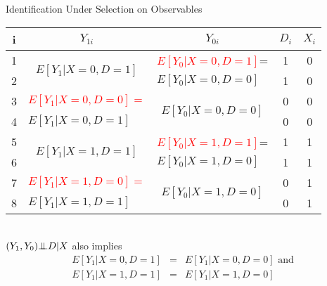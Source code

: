 \documentclass{beamer}
\numberwithin{equation}{section}
\newcommand{\indep}{{\bot\negthickspace\negthickspace\bot}}
\begin{document}
\begin{frame}{Identification Under Selection on Observables}
\begin{overprint}
\begin{small}
\begin{tabular}{c|c|c|c|c}
\hline
   i  & $Y_{1i}$  & $Y_{0i}$ &    $D_i$ &  $X_i$ \\
\hline
         1 & \multirow{2}{*}{$E[Y_1|X=0,D=1]$ } & \multicolumn{ 1}{c|}{\textcolor{red}{$E[Y_0|X=0,D=1]$}= } &                    1 &          0 \\
         2 & \multicolumn{ 1}{c|}{} & \multicolumn{ 1}{l|}{$E[Y_0|X=0,D=0]$} &                    1 &          0 \\
\hline
         3 & \multicolumn{ 1}{c|}{\textcolor{red}{$E[Y_1|X=0,D=0]=$}} & \multirow{2}{*}{$E[Y_0|X=0,D=0]$ } &                   0 &          0 \\
         4 & \multicolumn{ 1}{l|}{$E[Y_1|X=0,D=1]$} & \multicolumn{ 1}{c|}{} &                    0 &          0 \\
\hline
         5 & \multirow{2}{*}{$E[Y_1|X=1,D=1]$ } & \multicolumn{ 1}{c|}{\textcolor{red}{$E[Y_0|X=1,D=1]$}=} &                    1 &          1 \\
         6 & \multicolumn{ 1}{c|}{} & \multicolumn{ 1}{l|}{$E[Y_0|X=1,D=0]$} &                    1 &          1 \\
\hline
         7 &\multicolumn{ 1}{c|}{\textcolor{red}{$E[Y_1|X=1,D=0]=$}} & \multirow{2}{*}{$E[Y_0|X=1,D=0]$} &                    0 &          1 \\
         8 & \multicolumn{ 1}{l|}{$E[Y_1|X=1,D=1]$ } & \multicolumn{ 1}{c|}{} &                   0 &          1 \\
         \hline
\end{tabular}
\end{small}\bigskip\\
$(Y_1,Y_0) \indep D |X$ also implies
\begin{eqnarray}
E[Y_1|X=0,D=1] &=& E[Y_1|X=0,D=0]\,\, \mbox{and}\nonumber\\
 E[Y_1|X=1,D=1] &=& E[Y_1|X=1,D=0]\nonumber
\end{eqnarray}
\end{overprint}

\end{frame}
\end{document}
